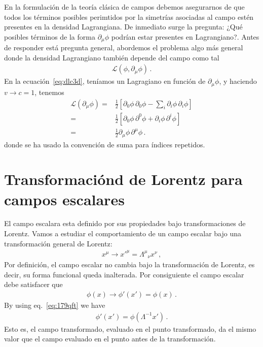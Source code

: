 En la formulación de la teoría clásica de campos debemos asegurarnos de que todos los términos posibles perimtidos por la simetrías asociadas al campo estén presentes en la densidad Lagrangiana. De inmediato surge la pregunta: ¿Qué posibles términos de la forma $\partial_{\mu}\phi$ podrían estar presentes en Lagrangiano?. Antes de responder está pregunta general, abordemos el problema algo más general donde la densidad Lagrangiano también depende del campo como tal
\begin{align*}
  \mathcal{L}(\phi,\partial_\mu \phi)\,.
\end{align*}
En la ecuación~\eqref{eq:dlc3d}, teníamos un Lagragiano en función de $\partial_{\mu}\phi$, y haciendo $v\to c=1$, tenemos
\begin{align*}
  \mathcal{L}(\partial_{\mu}\phi)
    =&\frac{1}{2}\left[
      {\partial_0\phi}\,{\partial_0\phi}-\sum_i{\partial_i\phi}\,{\partial_i\phi}
   \right]\nonumber\\
    =&\frac{1}{2}\left[
      {\partial_0\phi}\,{\partial^0\phi}+{\partial_i\phi}\,{\partial^i\phi}
   \right]\nonumber\\
   =&\frac{1}{2}{\partial_\mu\phi}\,{\partial^\mu\phi}\,.
\end{align*}
donde se ha usado la convención de suma para índices repetidos.


\section{Transformaciónd de Lorentz para campos escalares}

El campo escalara esta definido por sus propiedades bajo transformaciones de Lorentz. Vamos a estudiar el comportamiento de un campo escalar bajo una transformación general de Lorentz:
\begin{align}
\label{eq:179qft}
  x^\mu\to {x'}^\mu={\Lambda^\mu}_\nu x^\nu\,,
\end{align}
Por definición, el campo escalar no cambia bajo la transformación de Lorentz, es decir, su forma funcional queda inalterada. Por consiguiente el campo escalar debe satisfacer que
\begin{align}
  \phi(x)\to \phi'(x')=\phi(x)\,.
\end{align}
By using eq.~\eqref{eq:179qft} we have
\begin{align}
    \phi'(x')=\phi(\Lambda^{-1}x')\,.
\end{align}
Esto es, el campo transformado, evaluado en el punto transformado, da el mismo valor que el campo evaluado en el punto antes de la transformación. 

